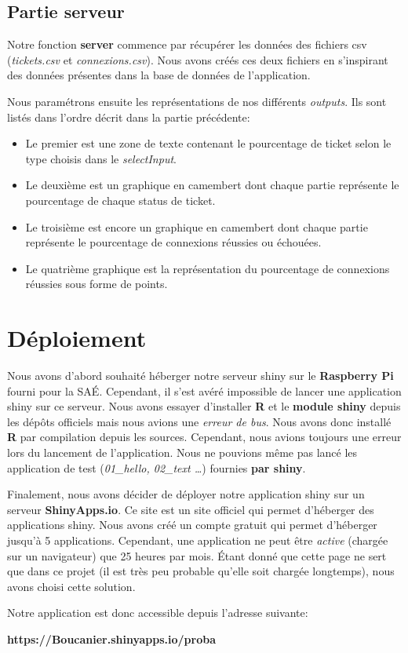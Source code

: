 \documentclass[12pt, a4paper]{article}
\begin{document}
\subsection*{Partie serveur}

Notre fonction \textbf{server} commence par récupérer les données des fichiers csv (\textit{tickets.csv} et \textit{connexions.csv}).
Nous avons créés ces deux fichiers en s'inspirant des données présentes dans la base de données de l'application.

\noindent Nous paramétrons ensuite les représentations de nos différents \textit{outputs}.
Ils sont listés dans l'ordre décrit dans la partie précédente:

\begin{itemize}
    \item Le premier est une zone de texte contenant le pourcentage de ticket selon le type choisis dans le \textit{selectInput}.
    \item Le deuxième est un graphique en camembert dont chaque partie représente le pourcentage de chaque status de ticket.
    \item Le troisième est encore un graphique en camembert dont chaque partie représente le pourcentage de connexions réussies ou échouées.
    \item Le quatrième graphique est la représentation du pourcentage de connexions réussies sous forme de points.
\end{itemize}

\section{Déploiement}

Nous avons d'abord souhaité héberger notre serveur shiny sur le \textbf{Raspberry Pi} fourni pour la SAÉ.
Cependant, il s'est avéré impossible de lancer une application shiny sur ce serveur.
Nous avons essayer d'installer \textbf{R} et le \textbf{module shiny} depuis les dépôts officiels mais nous avions une \textit{erreur de bus}.
Nous avons donc installé \textbf{R} par compilation depuis les sources.
Cependant, nous avions toujours une erreur lors du lancement de l'application.
Nous ne pouvions même pas lancé les application de test (\textit{01\_hello, 02\_text \ldots}) fournies \textbf{par shiny}.
\bigskip

Finalement, nous avons décider de déployer notre application shiny sur un serveur \textbf{ShinyApps.io}.
Ce site est un site officiel qui permet d'héberger des applications shiny.
Nous avons créé un compte gratuit qui permet d'héberger jusqu'à 5 applications.
Cependant, une application ne peut être \textit{active} (chargée sur un navigateur) que 25 heures par mois.
Étant donné que cette page ne sert que dans ce projet (il est très peu probable qu'elle soit chargée longtemps),
nous avons choisi cette solution.

\noindent Notre application est donc accessible depuis l'adresse suivante:
\bigskip

\noindent \textbf{https://Boucanier.shinyapps.io/proba}
\end{document}
